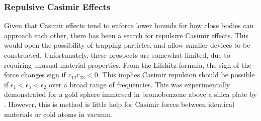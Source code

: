 




\subsubsection{Repulsive Casimir Effects}

Given that Casimir effects tend to enforce lower bounds for how close bodies can approach each other,
there has been a search for repulsive Casimir effects.  This would open the possibility
of trapping particles, and allow smaller devices to be constructed.  
Unfortunately, these prospects are somewhat limited, due to requiring unusual material properties.
From the Lifshitz formula, the sign of the force changes sign if $r_{12}r_{23}<0$.
This implies Casimir repulsion should be possible if $\epsilon_1<\epsilon_3<\epsilon_2$ over a broad range of frequencies.
This was experimentally demonstrated for a gold sphere immersed in bromobenzene above a silica plate
by \citet{Munday2009}.  However, this is method is little help for Casimir forces between
identical materials or cold atoms in vacuum.  

